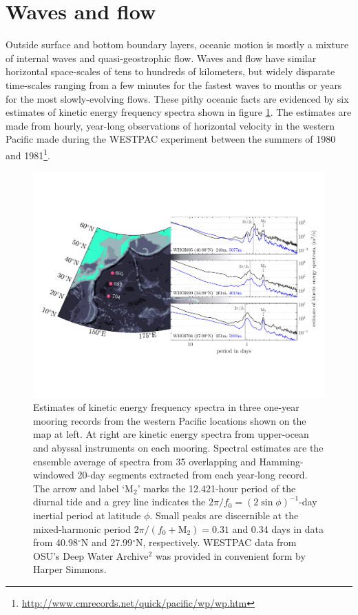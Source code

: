 \documentclass[12pt, oneside]{book}
\begin{document}
\pagestyle{main}

\section{Waves and flow}

Outside surface and bottom boundary layers, oceanic motion is mostly a mixture of internal waves and quasi-geostrophic flow. Waves and flow have similar horizontal space-scales of tens to hundreds of kilometers, but widely disparate time-scales ranging from a few minutes for the fastest waves to months or years for the most slowly-evolving flows.  These pithy oceanic facts are evidenced by six estimates of kinetic energy frequency spectra shown in figure \ref{frequencySpectraIntro}.  The estimates are made from hourly, year-long observations of horizontal velocity in the western Pacific made during the WESTPAC experiment between the summers of 1980 and 1981\footnote{\url{http://www.cmrecords.net/quick/pacific/wp/wp.htm}}.  

\begin{figure}[H]
\centering
\includegraphics[width = 1\textwidth]{mapAndSpectra}
\caption[Estimates of kinetic energy frequency spectra in three one-year mooring records]{Estimates of kinetic energy frequency spectra in three one-year mooring records from the western Pacific locations shown on the map at left.  At right are kinetic energy spectra from upper-ocean and abyssal instruments on each mooring.  Spectral estimates are the ensemble average of spectra from 35 overlapping and Hamming-windowed 20-day segments extracted from each year-long record.  The arrow and label `$\mathrm{M_2}$' marks the 12.421-hour period of the diurnal tide and a grey line indicates the $2 \pi / f_0 = \left ( 2 \sin \phi \right )^{-1}$-day inertial period at latitude $\phi$.  
Small peaks are discernible at the mixed-harmonic period $2 \pi / (f_0 + \mathrm{M_2}) =  0.31$ and 0.34 days in data from 40.98$^\circ$N and 27.99$^\circ$N, respectively.  
WESTPAC data from OSU's Deep Water Archive$^{2}$ was provided in convenient form by Harper Simmons.}
\label{frequencySpectraIntro}
\end{figure}
\end{document}
